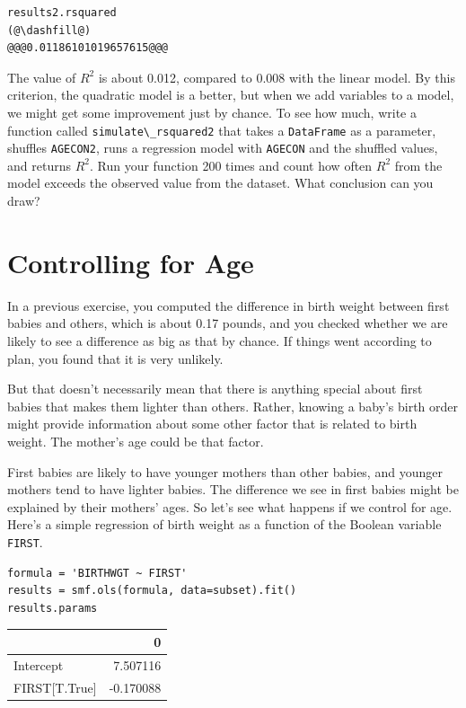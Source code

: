 \begin{lstlisting}[]
results2.rsquared
(@\dashfill@)
@@@0.01186101019657615@@@
\end{lstlisting}

The value of \(R^2\) is about 0.012, compared to 0.008 with the linear
model. By this criterion, the quadratic model is a better, but when we
add variables to a model, we might get some improvement just by chance.
To see how much, write a function called
\passthrough{\lstinline!simulate\_rsquared2!} that takes a
\passthrough{\lstinline!DataFrame!} as a parameter, shuffles
\passthrough{\lstinline!AGECON2!}, runs a regression model with
\passthrough{\lstinline!AGECON!} and the shuffled values, and returns
\(R^2\). Run your function 200 times and count how often \(R^2\) from
the model exceeds the observed value from the dataset. What conclusion
can you draw?

\hypertarget{controlling-for-age}{%
\section{Controlling for Age}\label{controlling-for-age}}

In a previous exercise, you computed the difference in birth weight
between first babies and others, which is about 0.17 pounds, and you
checked whether we are likely to see a difference as big as that by
chance. If things went according to plan, you found that it is very
unlikely.

But that doesn't necessarily mean that there is anything special about
first babies that makes them lighter than others. Rather, knowing a
baby's birth order might provide information about some other factor
that is related to birth weight. The mother's age could be that factor.

First babies are likely to have younger mothers than other babies, and
younger mothers tend to have lighter babies. The difference we see in
first babies might be explained by their mothers' ages. So let's see
what happens if we control for age. Here's a simple regression of birth
weight as a function of the Boolean variable
\passthrough{\lstinline!FIRST!}.

\begin{lstlisting}[]
formula = 'BIRTHWGT ~ FIRST'
results = smf.ols(formula, data=subset).fit()
results.params
\end{lstlisting}

\begin{tabular}{lr}
\midrule
{} &         0 \\
\midrule
Intercept     &  7.507116 \\
FIRST[T.True] & -0.170088 \\
\midrule
\end{tabular}

